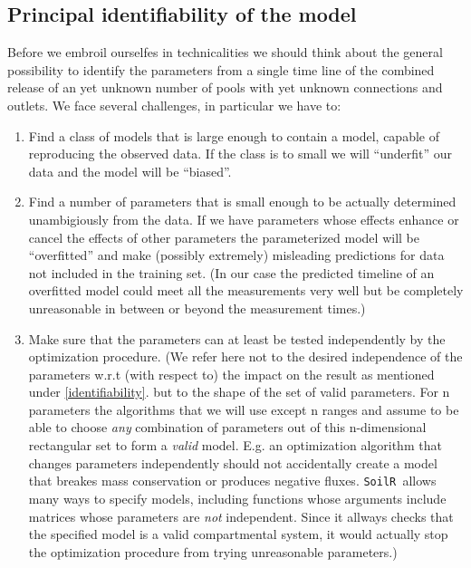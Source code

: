 \documentclass[a4paper]{article}\usepackage[]{graphicx}\usepackage[]{color}
\newcommand{\SoilR}{\texttt{SoilR }}
\newcommand{\enumref}[1]{\ref{#1}.}
\begin{document}
\subsection{Principal identifiability of the model}
Before we embroil ourselfes in technicalities we should think about the general possibility to identify the parameters from a single time line of the combined release of an yet unknown number of pools with yet unknown connections and outlets. 
We face several challenges, in particular we have to:
\begin{enumerate}
\item 
	\label{accuracy} Find a class of models that is large enough to contain a model, capable of reproducing the observed data. If the class is to small we will ``underfit'' our data and the model will be ``biased''.
\item 
	\label{identifiability} Find a number of parameters that is small enough to be actually determined unambigiously from the data. If we have parameters whose effects enhance or cancel the effects of other parameters the parameterized model will be ``overfitted'' and make (possibly extremely) misleading predictions for data not included in the training set. (In our case the predicted timeline of an overfitted model could meet all the measurements very well but be completely unreasonable in between or beyond the measurement times.)
\item 
	\label{independence} Make sure that the parameters can at least be tested independently by the optimization procedure. 
		(We refer here not to the desired independence of the parameters w.r.t (with respect to) the impact on the result as mentioned under \enumref{identifiability} but to the shape of the set of valid parameters. 
		For n parameters the algorithms that we will use except 
		n ranges and assume to be able to choose \emph{any} combination 
		of parameters out of this n-dimensional rectangular set to form a \emph{valid} model.
		E.g. an optimization algorithm that changes parameters independently should 
		not accidentally create a model that breakes mass conservation or produces negative fluxes.
		\SoilR allows many ways to specify models, including functions whose arguments include matrices whose parameters are \emph{not} independent.
		Since it allways checks that the specified model is a valid compartmental system, it would actually stop the optimization procedure from trying 
		unreasonable parameters.)
\end{enumerate}
\end{document}
